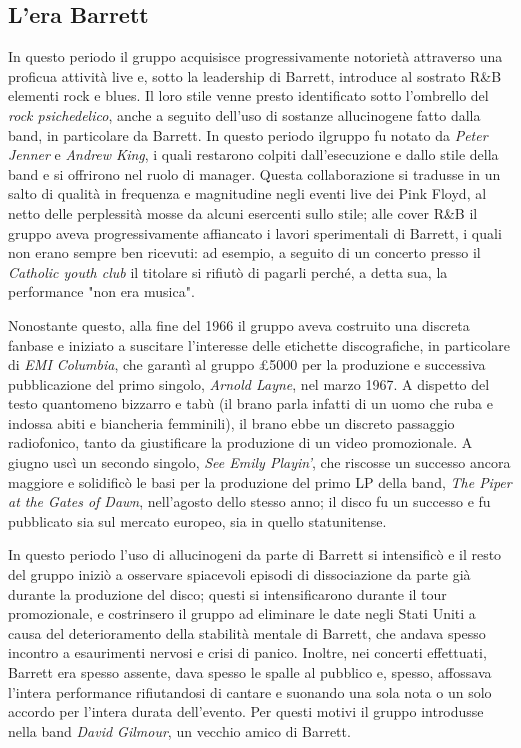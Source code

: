 \documentclass[class=book, crop=false, oneside, 12pt]{standalone}
\begin{document}
    \subsection{L'era Barrett}
    In questo periodo il gruppo acquisisce progressivamente notorietà attraverso una proficua attività live e, sotto la leadership di Barrett, introduce al sostrato R\&B elementi rock e blues. Il loro stile venne presto identificato sotto l'ombrello del \emph{rock psichedelico}, anche a seguito dell'uso di sostanze allucinogene fatto dalla band, in particolare da Barrett. In questo periodo ilgruppo fu notato da \emph{Peter Jenner} e \emph{Andrew King}, i quali restarono colpiti dall'esecuzione e dallo stile della band e si offrirono nel ruolo di manager. Questa collaborazione si tradusse in un salto di qualità in frequenza e magnitudine negli eventi live dei Pink Floyd, al netto delle perplessità mosse da alcuni esercenti sullo stile; alle cover R\&B il gruppo aveva progressivamente affiancato i lavori sperimentali di Barrett, i quali non erano sempre ben ricevuti: ad esempio, a seguito di un concerto presso il \emph{Catholic youth club} il titolare si rifiutò di pagarli perché, a detta sua, la performance "non era musica". 
    
    Nonostante questo, alla fine del 1966 il gruppo aveva costruito una discreta fanbase e iniziato a suscitare l'interesse delle etichette discografiche, in particolare di \emph{EMI Columbia}, che garantì al gruppo \pounds 5000 per la produzione e successiva pubblicazione del primo singolo, \emph{Arnold Layne}, nel marzo 1967. A dispetto del testo quantomeno bizzarro e tabù (il brano parla infatti di un uomo che ruba e indossa abiti e biancheria femminili), il brano ebbe un discreto passaggio radiofonico, tanto da giustificare la produzione di un video promozionale. A giugno uscì un secondo singolo, \emph{See  Emily Playin'}, che riscosse un successo ancora maggiore e solidificò le basi per la produzione del primo LP della band, \emph{The Piper at the Gates of Dawn}, nell'agosto dello stesso anno; il disco fu un successo e fu pubblicato sia sul mercato europeo, sia in quello statunitense. 
    
    In questo periodo l'uso di allucinogeni da parte di Barrett si intensificò e il resto del gruppo iniziò a osservare spiacevoli episodi di dissociazione da parte già durante la produzione del disco; questi si intensificarono durante il tour promozionale, e costrinsero il gruppo ad eliminare le date negli Stati Uniti a causa del deterioramento della stabilità mentale di Barrett, che andava spesso incontro a esaurimenti nervosi e crisi di panico. Inoltre, nei concerti effettuati, Barrett era spesso assente, dava spesso le spalle al pubblico e, spesso, affossava l'intera performance rifiutandosi di cantare e suonando una sola nota o un solo accordo per l'intera durata dell'evento. Per questi motivi il gruppo introdusse nella band \emph{David Gilmour}, un vecchio amico di Barrett. 
    
\end{document}
